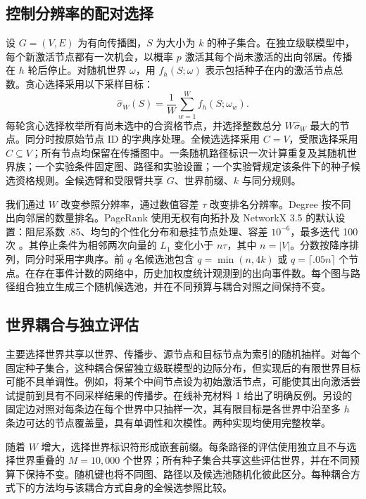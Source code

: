 \documentclass[smallextended]{svjour3}
\begin{document}
\subsection{控制分辨率的配对选择}
设 $G=(V,E)$ 为有向传播图，$S$ 为大小为 $k$ 的种子集合。在独立级联模型中，每个新激活节点都有一次机会，以概率 $p$ 激活其每个尚未激活的出向邻居。传播在 $h$ 轮后停止。对随机世界 $\omega$，用 $f_h(S;\omega)$ 表示包括种子在内的激活节点总数。贪心选择采用以下采样目标：
\begin{equation}
\widehat\sigma_W(S)=\frac{1}{W}\sum_{w=1}^{W}f_h(S;\omega_w).
\end{equation}
每轮贪心选择枚举所有尚未选中的合资格节点，并选择整数总分 $W\widehat\sigma_W$ 最大的节点。同分时按原始节点 ID 的字典序处理。全候选选择采用 $C=V$，受限选择采用 $C\subseteq V$；所有节点均保留在传播图中。一条随机路径标识一次计算重复及其随机世界族；一个实验条件固定图、路径和实验设置；一个实验臂规定该条件下的种子候选资格规则。全候选臂和受限臂共享 $G$、世界前缀、$k$ 与同分规则。

我们通过 $W$ 改变参照分辨率，通过数值容差 $\tau$ 改变排名分辨率。Degree 按不同出向邻居的数量排名。PageRank 使用无权有向拓扑及 NetworkX 3.5 的默认设置：阻尼系数 .85、均匀的个性化分布和悬挂节点处理、容差 $10^{-6}$，最多迭代 100 次 \cite{networkxpr}。其停止条件为相邻两次向量的 $L_1$ 变化小于 $n\tau$，其中 $n=|V|$。分数按降序排列，同分时采用字典序。前 $q$ 名候选池包含 $q=\min(n,4k)$ 或 $q=\lceil .05n\rceil$ 个节点。在存在事件计数的网络中，历史加权度统计观测到的出向事件数。每个图与路径组合独立生成三个随机候选池，并在不同预算与耦合对照之间保持不变。

\subsection{世界耦合与独立评估}\label{sec:coupling}
主要选择世界共享以世界、传播步、源节点和目标节点为索引的随机抽样。对每个固定种子集合，这种耦合保留独立级联模型的边际分布，但实现后的有限世界目标可能不具单调性。例如，将某个中间节点设为初始激活节点，可能使其出向激活尝试提前到具有不同采样结果的传播步。在线补充材料 1 给出了明确反例。另设的固定边对照对每条边在每个世界中只抽样一次，其有限目标是各世界中沿至多 $h$ 条边可达的节点覆盖量，具有单调性和次模性。两种实现均使用完整枚举。

随着 $W$ 增大，选择世界标识符形成嵌套前缀。每条路径的评估使用独立且不与选择世界重叠的 $M=10,000$ 个世界；所有种子集合共享这些评估世界，并在不同预算下保持不变。随机键也将不同图、路径以及候选池随机化彼此区分。每种耦合方式下的方法均与该耦合方式自身的全候选参照比较。
\end{document}
